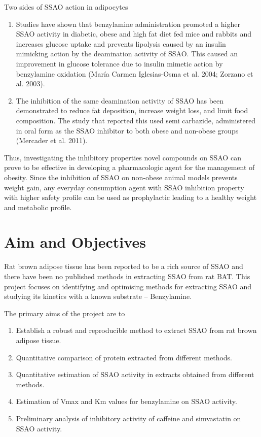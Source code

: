 \documentclass[
  letterpaper,
  DIV=11,
  numbers=noendperiod]{scrreprt}
\providecommand{\tightlist}{%
  \setlength{\itemsep}{0pt}\setlength{\parskip}{0pt}}\usepackage{longtable,booktabs,array}
\begin{document}
Two sides of SSAO action in adipocytes

\begin{enumerate}
\def\labelenumi{\arabic{enumi}.}
\tightlist
\item
  Studies have shown that benzylamine administration promoted a higher
  SSAO activity in diabetic, obese and high fat diet fed mice and
  rabbits and increases glucose uptake and prevents lipolysis caused by
  an insulin mimicking action by the deamination activity of SSAO. This
  caused an improvement in glucose tolerance due to insulin mimetic
  action by benzylamine oxidation (María Carmen Iglesias-Osma et al.
  2004; Zorzano et al. 2003).
\item
  The inhibition of the same deamination activity of SSAO has been
  demonstrated to reduce fat deposition, increase weight loss, and limit
  food composition. The study that reported this used semi carbazide,
  administered in oral form as the SSAO inhibitor to both obese and
  non-obese groups (Mercader et al. 2011).
\end{enumerate}

Thus, investigating the inhibitory properties novel compounds on SSAO
can prove to be effective in developing a pharmacologic agent for the
management of obesity. Since the inhibition of SSAO on non-obese animal
models prevents weight gain, any everyday consumption agent with SSAO
inhibition property with higher safety profile can be used as
prophylactic leading to a healthy weight and metabolic profile.


\chapter{Aim and Objectives}\label{aim-and-objectives}

Rat brown adipose tissue has been reported to be a rich source of SSAO
and there have been no published methods in extracting SSAO from rat
BAT. This project focuses on identifying and optimising methods for
extracting SSAO and studying its kinetics with a known substrate --
Benzylamine.

The primary aims of the project are to

\begin{enumerate}
\def\labelenumi{\arabic{enumi}.}
\tightlist
\item
  Establish a robust and reproducible method to extract SSAO from rat
  brown adipose tissue.
\item
  Quantitative comparison of protein extracted from different methods.
\item
  Quantitative estimation of SSAO activity in extracts obtained from
  different methods.
\item
  Estimation of Vmax and Km values for benzylamine on SSAO activity.
\item
  Preliminary analysis of inhibitory activity of caffeine and
  simvastatin on SSAO activity.
\end{enumerate}
\end{document}
